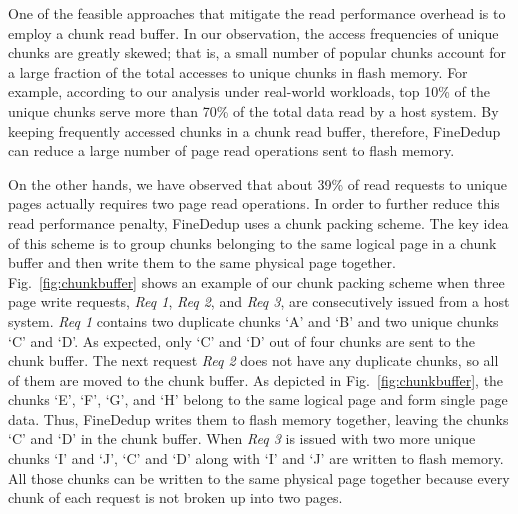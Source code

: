 One of the feasible approaches that mitigate the read performance overhead is to employ a chunk read buffer.
In our observation, 
the access frequencies of unique chunks are greatly skewed;
that is, a small number of popular chunks account for a large fraction of the total accesses to unique chunks in flash memory.
For example, according to our analysis under real-world workloads, 
top 10\% of the unique chunks serve more than 70\% of the total data read by a host system.
By keeping frequently accessed chunks in a chunk read buffer,
therefore, FineDedup can reduce a large number of page read operations sent to flash memory.

On the other hands, we have observed that about 39\% of read requests to unique pages actually requires two page read operations.
In order to further reduce this read performance penalty,
FineDedup uses a chunk packing scheme.
The key idea of this scheme is to
group chunks belonging to the same logical page in a chunk buffer and 
then write them to the same physical page together.
Fig.~\ref{fig:chunkbuffer} shows an example of our chunk packing scheme
when three page write requests, \textit{Req 1}, \textit{Req 2}, and \textit{Req 3}, are consecutively issued from a host system.
\textit{Req 1} contains two duplicate chunks `A' and `B' and two unique chunks `C' and `D'.
As expected, only `C' and `D' out of four chunks are sent to the chunk buffer.
The next request \textit{Req 2} does not have any duplicate chunks,
so all of them are moved to the chunk buffer.
As depicted in Fig.~\ref{fig:chunkbuffer},
the chunks `E', `F', `G', and `H' belong to the same logical page and form single page data.
Thus, FineDedup writes them to flash memory together,
leaving the chunks `C' and `D' in the chunk buffer.
When \textit{Req 3} is issued with two more unique chunks `I' and `J', 
`C' and `D' along with `I' and `J' are written to flash memory.
All those chunks can be written to the same physical page together
because every chunk of each request is not broken up into two pages.

